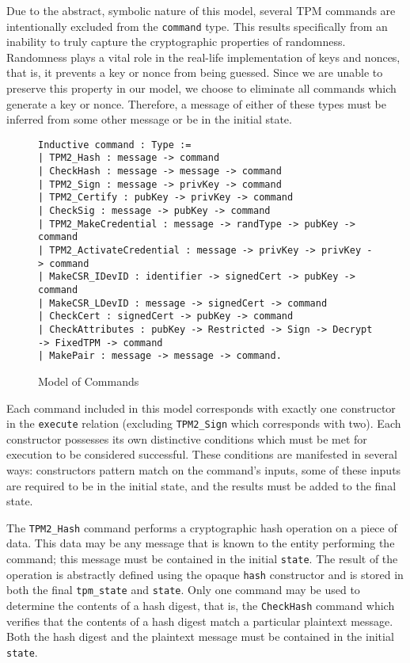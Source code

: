 Due to the abstract, symbolic nature of this model, several TPM commands are intentionally excluded from the \verb|command| type. This results specifically from an inability to truly capture the cryptographic properties of randomness. Randomness plays a vital role in the real-life implementation of keys and nonces, that is, it prevents a key or nonce from being guessed. Since we are unable to preserve this property in our model, we choose to eliminate all commands which generate a key or nonce. Therefore, a message of either of these types must be inferred from some other message or be in the initial state. 
\begin{figure}[h]
\begin{lstlisting}[language=Coq]
Inductive command : Type :=
| TPM2_Hash : message -> command
| CheckHash : message -> message -> command
| TPM2_Sign : message -> privKey -> command
| TPM2_Certify : pubKey -> privKey -> command
| CheckSig : message -> pubKey -> command
| TPM2_MakeCredential : message -> randType -> pubKey -> command
| TPM2_ActivateCredential : message -> privKey -> privKey -> command
| MakeCSR_IDevID : identifier -> signedCert -> pubKey -> command
| MakeCSR_LDevID : message -> signedCert -> command
| CheckCert : signedCert -> pubKey -> command
| CheckAttributes : pubKey -> Restricted -> Sign -> Decrypt -> FixedTPM -> command
| MakePair : message -> message -> command.
\end{lstlisting}
\caption{Model of Commands}
\end{figure}
Each command included in this model corresponds with exactly one constructor in the \verb|execute| relation (excluding \verb|TPM2_Sign| which corresponds with two). Each constructor possesses its own distinctive conditions which must be met for execution to be considered successful. These conditions are manifested in several ways: constructors pattern match on the command's inputs, some of these inputs are required to be in the initial state, and the results must be added to the final state. 





The \verb|TPM2_Hash| command performs a cryptographic hash operation on a piece of data. This data may be any message that is known to the entity performing the command; this message must be contained in the initial \verb|state|. The result of the operation is abstractly defined using the opaque \verb|hash| constructor and is stored in both the final \verb|tpm_state| and \verb|state|. Only one command may be used to determine the contents of a hash digest, that is, the \verb|CheckHash| command which verifies that the contents of a hash digest match a particular plaintext message. Both the hash digest and the plaintext message must be contained in the initial \verb|state|.


